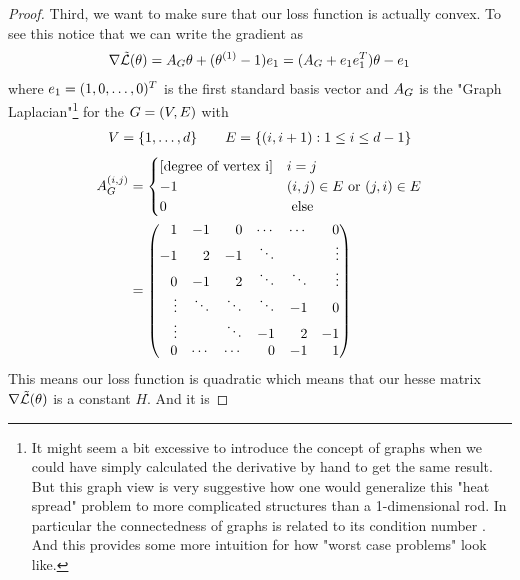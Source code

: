 \begin{proof}
	Third, we want to make sure that our loss function is actually convex. To
	see this notice that we can write the gradient as
	\begin{align}\label{eq: naive complexity example loss gradient}
		\nabla \tilde{\mathcal{L}}(\theta)
		= A_G\theta + (\theta^{(1)} -1) e_1
		= (A_G + e_1 e_1^T)\theta - e_1
	\end{align}
	where \(e_1=(1,0,\dots,0)^T\) is the first standard basis
	vector and \(A_G\) is the "Graph Laplacian"\footnote{
		It might seem a bit excessive to introduce the concept of graphs when
		we could have simply calculated the derivative by hand to get the same
		result. But this graph view is very suggestive how one would generalize
		this "heat spread" problem to more complicated structures than a
		1-dimensional rod. In particular the connectedness of graphs is related
		to its condition number \parencite{gohWhyMomentumReally2017}. And this
		provides some more intuition for how "worst case problems" look like.
	} for the 
	 \(G=(V, E)\) with 
	\begin{align*}
		V = \{1,\dots, d\}
		\qquad
		E = \{(i, i+1) : 1\le i \le d-1\}
	\end{align*}
	\begin{align*}
		\graphLaplacian^{(i,j)} 
		&= 
		\begin{cases}
			[\text{degree of vertex i}] & i=j\\
			-1 & (i,j)\in\edges \text{ or } (j,i)\in\edges\\
			0 & \text{ else}
		\end{cases}
		\\
		&=
		\begin{pmatrix*}[r]
			1 & -1 & 0  & \cdots & \cdots & 0 \\
			-1 & 2 & -1 & \ddots &  &  \vdots \\ 
			0 & -1 & 2 & \ddots & \ddots & \vdots \\
			\vdots & \ddots & \ddots & \ddots & -1 & 0 \\
			\vdots &  & \ddots & -1 & 2 & -1 \\
			0 & \cdots & \cdots & 0  & -1 & 1
		\end{pmatrix*}
	\end{align*}
	This means our loss function is quadratic which means that our
	hesse matrix \(\nabla \tilde{\mathcal{L}}(\theta)\) is a constant \(H\). And it is

\end{proof}
